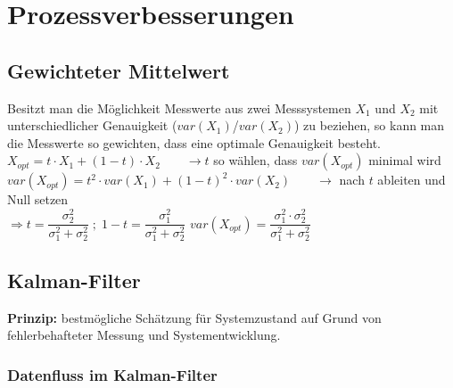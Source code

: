 \section{Prozessverbesserungen}

\subsection{Gewichteter Mittelwert}
	Besitzt man die Möglichkeit Messwerte aus zwei Messsystemen $X_1$ und $X_2$ mit unterschiedlicher Genauigkeit ($var(X_1)$/$var(X_2)$) zu beziehen, so kann man die Messwerte so gewichten, dass eine optimale Genauigkeit besteht.\\
	
	$\boxed{X_{opt} = t\cdot X_1 + (1-t) \cdot X_2} \qquad \rightarrow t$ so wählen, dass $var(X_{opt})$ minimal wird\\
	
	\hspace*{1cm} $var(X_{opt}) = t^2 \cdot var(X_1) + (1-t)^2 \cdot var(X_2) \qquad \rightarrow$ nach $t$ ableiten und Null setzen \\  
	
	$\Rightarrow \boxed{t = \dfrac{\sigma_2^2}{\sigma_1^2 + \sigma_2^2}} \; ; \; \boxed{1-t = \dfrac{\sigma_1^2}{\sigma_1^2 + \sigma_2^2}}$
	\hspace{1cm} $var(X_{opt}) = \dfrac{\sigma_1^2 \cdot \sigma_2^2}{\sigma_1^2 + \sigma_2^2}$



\subsection{Kalman-Filter}
	\textbf{Prinzip:} bestmögliche Schätzung für Systemzustand auf Grund von fehlerbehafteter
	Messung und Systementwicklung. \\

	\subsubsection{Datenfluss im Kalman-Filter}
		
	
